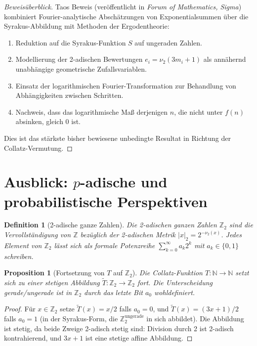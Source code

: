\documentclass[12pt,a4paper]{article}
\newtheorem{proposition}[theorem]{Proposition}
\newtheorem{definition}[theorem]{Definition}
\begin{document}
\begin{proof}[Beweisüberblick]
Taos Beweis \cite{Tao2022} (veröffentlicht in \emph{Forum of Mathematics, Sigma})
kombiniert Fourier-analytische Abschätzungen von
Exponentialsummen über die Syrakus-Abbildung mit Methoden der Ergodentheorie:
\begin{enumerate}
  \item Reduktion auf die Syrakus-Funktion $S$ auf ungeraden Zahlen.
  \item Modellierung der 2-adischen Bewertungen $e_i = \nu_2(3m_i+1)$ als annähernd
        unabhängige geometrische Zufallsvariablen.
  \item Einsatz der logarithmischen Fourier-Transformation zur Behandlung von
        Abhängigkeiten zwischen Schritten.
  \item Nachweis, dass das logarithmische Maß derjenigen $n$, die nicht unter
        $f(n)$ absinken, gleich 0 ist.
\end{enumerate}
Dies ist das stärkste bisher bewiesene unbedingte Resultat in Richtung der
Collatz-Vermutung.
\end{proof}

\section{Ausblick: $p$-adische und probabilistische Perspektiven}\label{sec:padic_preview}

\begin{definition}[2-adische ganze Zahlen]\label{def:2adic}
Die \emph{2-adischen ganzen Zahlen} $\mathbb{Z}_2$ sind die Vervollständigung von
$\mathbb{Z}$ bezüglich der 2-adischen Metrik $|x|_2 = 2^{-\nu_2(x)}$. Jedes Element
von $\mathbb{Z}_2$ lässt sich als formale Potenzreihe $\sum_{k=0}^\infty a_k 2^k$
mit $a_k \in \{0,1\}$ schreiben.
\end{definition}

\begin{proposition}[Fortsetzung von $T$ auf $\mathbb{Z}_2$]\label{prop:extension}
Die Collatz-Funktion $T\colon \mathbb{N} \to \mathbb{N}$ setzt sich zu einer stetigen
Abbildung $\tilde{T}\colon \mathbb{Z}_2 \to \mathbb{Z}_2$ fort. Die Unterscheidung
gerade/ungerade ist in $\mathbb{Z}_2$ durch das letzte Bit $a_0$ wohldefiniert.
\end{proposition}

\begin{proof}
Für $x \in \mathbb{Z}_2$ setze $\tilde{T}(x) = x/2$ falls $a_0 = 0$, und
$\tilde{T}(x) = (3x+1)/2$ falls $a_0 = 1$ (in der Syrakus-Form, die
$\mathbb{Z}_2^{\text{ungerade}}$ in sich abbildet). Die Abbildung ist stetig, da
beide Zweige 2-adisch stetig sind: Division durch 2 ist 2-adisch kontrahierend,
und $3x+1$ ist eine stetige affine Abbildung.
\end{proof}
\end{document}
